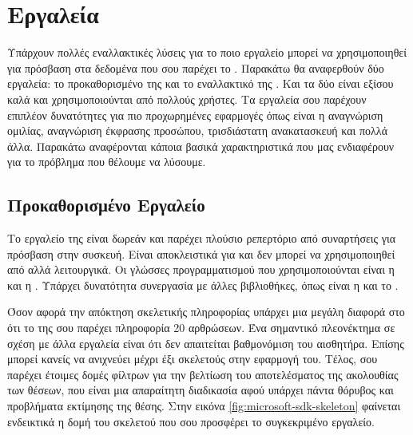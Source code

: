 \section{Εργαλεία}

Υπάρχουν πολλές εναλλακτικές λύσεις για το ποιο εργαλείο μπορεί να χρησιμοποιηθεί για πρόσβαση στα δεδομένα που σου παρέχει το . Παρακάτω θα αναφερθούν δύο εργαλεία: το προκαθορισμένο  της  και το εναλλακτικό της . Και τα δύο είναι εξίσου καλά και χρησιμοποιούνται από πολλούς χρήστες. Τα εργαλεία σου παρέχουν επιπλέον δυνατότητες για πιο προχωρημένες εφαρμογές όπως είναι η αναγνώριση ομιλίας, αναγνώριση έκφρασης προσώπου, τρισδιάστατη ανακατασκευή και πολλά άλλα. Παρακάτω αναφέρονται κάποια βασικά χαρακτηριστικά που μας ενδιαφέρουν για το πρόβλημα που θέλουμε να λύσουμε.

\subsection{Προκαθορισμένο Εργαλείο}

Το εργαλείο της  είναι δωρεάν και παρέχει πλούσιο ρεπερτόριο από συναρτήσεις για πρόσβαση στην συσκευή. Είναι αποκλειστικά για  και δεν μπορεί να χρησιμοποιηθεί από αλλά λειτουργικά. Οι γλώσσες προγραμματισμού που χρησιμοποιούνται είναι η  και η . Υπάρχει δυνατότητα συνεργασία με άλλες βιβλιοθήκες, όπως είναι η  και το .

Όσον αφορά την απόκτηση σκελετικής πληροφορίας υπάρχει μια μεγάλη διαφορά στο ότι το  της  σου παρέχει πληροφορία 20 αρθρώσεων. Ένα σημαντικό πλεονέκτημα σε σχέση με άλλα εργαλεία είναι ότι δεν απαιτείται βαθμονόμιση του αισθητήρα. Επίσης μπορεί κανείς να ανιχνεύει μέχρι έξι σκελετούς στην εφαρμογή του. Τέλος, σου παρέχει έτοιμες δομές φίλτρων για την βελτίωση του αποτελέσματος της ακολουθίας των θέσεων, που είναι μια απαραίτητη διαδικασία αφού υπάρχει πάντα θόρυβος και προβλήματα εκτίμησης της θέσης. Στην εικόνα \ref{fig:microsoft-sdk-skeleton} φαίνεται ενδεικτικά η δομή του σκελετού που σου προσφέρει το συγκεκριμένο εργαλείο.

